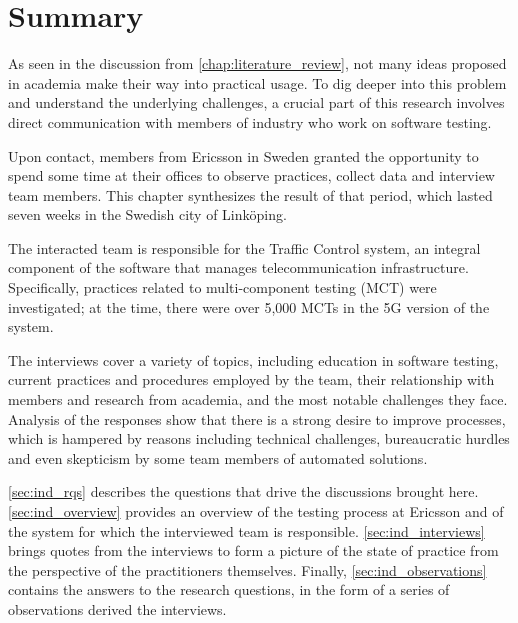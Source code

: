\section{Summary}\label{sec:ind_summary}

As seen in the discussion from \autoref{chap:literature_review}, not many ideas proposed in academia make their way into practical usage.
To dig deeper into this problem and understand the underlying challenges, a crucial part of this research involves direct communication with members of industry who work on software testing.

Upon contact, members from Ericsson in Sweden granted the opportunity to spend some time at their offices to observe practices, collect data and interview team members.
This chapter synthesizes the result of that period, which lasted seven weeks in the Swedish city of Link\"oping.

The interacted team is responsible for the Traffic Control system, an integral component of the software that manages telecommunication infrastructure.
Specifically, practices related to multi-component testing (MCT) were investigated; at the time, there were over 5,000 MCTs in the 5G version of the system.

The interviews cover a variety of topics, including education in software testing, current practices and procedures employed by the team, their relationship with members and research from academia, and the most notable challenges they face.
Analysis of the responses show that there is a strong desire to improve processes, which is hampered by reasons including technical challenges, bureaucratic hurdles and even skepticism by some team members of automated solutions.

\autoref{sec:ind_rqs} describes the questions that drive the discussions brought here.
\autoref{sec:ind_overview} provides an overview of the testing process at Ericsson and of the system for which the interviewed team is responsible.
\autoref{sec:ind_interviews} brings quotes from the interviews to form a picture of the state of practice from the perspective of the practitioners themselves.
Finally, \autoref{sec:ind_observations} contains the answers to the research questions, in the form of a series of observations derived the interviews.




